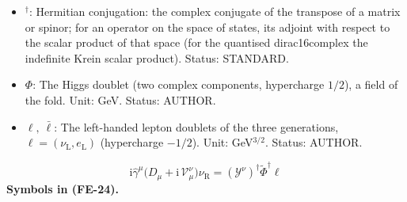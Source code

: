 \documentclass[
  10pt,
]{article}
\begin{document}
\begin{itemize}
  neutrinos. Unit: dimensionless. Status: STANDARD.
\item
  \({}^\dagger\): Hermitian conjugation: the complex conjugate of the
  transpose of a matrix or spinor; for an operator on the space of
  states, its adjoint with respect to the scalar product of that space
  (for the quantised dirac16complex the indefinite Krein scalar
  product). Status: STANDARD.
\item
  \(\Phi\): The Higgs doublet (two complex components, hypercharge
  \(1/2\)), a field of the fold. Unit: GeV. Status: AUTHOR.
\item
  \(\ell,\ \bar\ell\): The left-handed lepton doublets of the three
  generations, \(\ell = (\nu_{\mathrm{L}}, e_{\mathrm{L}})\)
  (hypercharge \(-1/2\)). Unit: GeV\(^{3/2}\). Status: AUTHOR.
\end{itemize}

\[
\mathrm{i}\hat\gamma^\mu\big(D_\mu + \mathrm{i}\,\mathcal{V}^{\nu}_\mu\big)\nu_{\mathrm{R}} = (\mathcal{Y}^{\nu})^\dagger\tilde\Phi^\dagger\ell \tag{FE-24}
\] \textbf{Symbols in (FE-24).}
\end{document}
